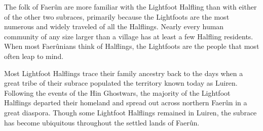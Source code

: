 
The folk of Faerûn are more familiar with the Lightfoot Halfling than with either of the other two subraces, primarily because the Lightfoots are the most numerous and widely traveled of all the Halflings. Nearly every human community of any size larger than a village has at least a few Halfling residents. When most Faerûnians think of Halflings, the Lightfoots are the people that most often leap to mind.

Most Lightfoot Halflings trace their family ancestry back to the days when a great tribe of their subrace populated the territory known today as Luiren. Following the events of the Hin Ghostwars, the majority of the Lightfoot Halflings departed their homeland and spread out across northern Faerûn in a great diaspora. Though some Lightfoot Halflings remained in Luiren, the subrace has become ubiquitous throughout the settled lands of Faerûn.

